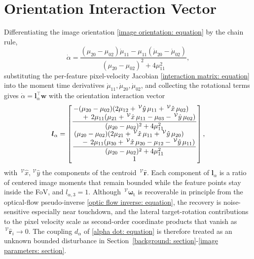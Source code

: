 \documentclass{IEEEtaes}
\begin{document}
\section{Orientation Interaction Vector} \label{l alpha appendix: section}
Differentiating the image orientation \eqref{image orientation: equation} by the chain rule,
\begin{equation} \label{alpha chain: equation}
    \dot{\alpha} = \frac{(\mu_{20}-\mu_{02})\dot{\mu}_{11} - \mu_{11}(\dot{\mu}_{20}-\dot{\mu}_{02})}{(\mu_{20}-\mu_{02})^2 + 4\mu_{11}^2},
\end{equation}
substituting the per-feature pixel-velocity Jacobian \eqref{interaction matrix: equation} into the moment time derivatives $\dot{\mu}_{11},\dot{\mu}_{20},\dot{\mu}_{02}$, and collecting the rotational terms gives $\dot{\alpha}=\boldsymbol{l}_\alpha^\top\boldsymbol{w}$ with the orientation interaction vector
\begin{equation} \label{l alpha: equation}
\boldsymbol{l}_\alpha = \begin{bmatrix}
\dfrac{\splitfrac{-(\mu_{20}-\mu_{02})(2\mu_{12} + \,^\mathcal{V}\hat{y}\,\mu_{11} + \,^\mathcal{V}\hat{x}\,\mu_{02})}{+\, 2\mu_{11}(\mu_{21} + \,^\mathcal{V}\hat{x}\,\mu_{11} - \mu_{03} - \,^\mathcal{V}\hat{y}\,\mu_{02})}}{(\mu_{20}-\mu_{02})^2 + 4\mu_{11}^2} \\[6pt]
\dfrac{\splitfrac{(\mu_{20}-\mu_{02})(2\mu_{21} + \,^\mathcal{V}\hat{x}\,\mu_{11} + \,^\mathcal{V}\hat{y}\,\mu_{20})}{-\, 2\mu_{11}(\mu_{30} + \,^\mathcal{V}\hat{x}\,\mu_{20} - \mu_{12} - \,^\mathcal{V}\hat{y}\,\mu_{11})}}{(\mu_{20}-\mu_{02})^2 + 4\mu_{11}^2} \\[6pt]
1
\end{bmatrix},
\end{equation}
with $\,^\mathcal{V}\hat{x},\,^\mathcal{V}\hat{y}$ the components of the centroid $\,^\mathcal{V}\hat{\boldsymbol{r}}$. Each component of $\boldsymbol{l}_\alpha$ is a ratio of centered image moments that remain bounded while the feature points stay inside the FoV, and $l_{\alpha,3}=1$. Although $\,^\mathcal{V}\boldsymbol{\omega}_\text{t}$ is recoverable in principle from the optical-flow pseudo-inverse \eqref{optic flow inverse: equation}, the recovery is noise-sensitive especially near touchdown, and the lateral target-rotation contributions to the pixel velocity scale as second-order coordinate products that vanish as $\,^\mathcal{V}\hat{\boldsymbol{r}}_i \to 0$. The coupling $d_\alpha$ of \eqref{alpha dot: equation} is therefore treated as an unknown bounded disturbance in Section~\ref{background: section}-\ref{image parameters: section}.
\end{document}
